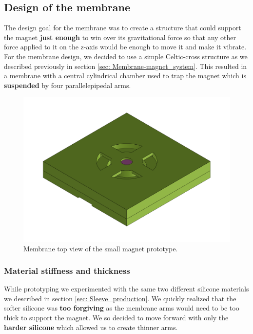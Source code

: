 \subsection{Design of the membrane}
\label{sec: Design_of_the_membrane}
The design goal for the membrane was to create a structure that could support the magnet \textbf{just enough} to win over its gravitational force so that any other force applied to it on the z-axis would be enough to move it and make it vibrate.
For the membrane design, we decided to use a simple Celtic-cross structure as we described previously in section \ref{sec: Membrane-magnet_system}.
This resulted in a membrane with a central cylindrical chamber used to trap the magnet which is \textbf{suspended} by four parallelepipedal arms.
\begin{figure}[H]
    \centering
    \includegraphics[width=0.7\linewidth]{Chapters/Chapter5/Flexible_Mat_Prototypes/Figures/membrane_v1.png}
    \caption{Membrane top view of the small magnet prototype.}
    \label{fig: Membrane_v1_model}
\end{figure}

\subsubsection{Material stiffness and thickness}
While prototyping we experimented with the same two different silicone materials we described in section \ref{sec: Sleeve_production}.
We quickly realized that the softer silicone was \textbf{too forgiving} as the membrane arms would need to be too thick to support the magnet.
We so decided to move forward with only the \textbf{harder silicone} which allowed us to create thinner arms.


